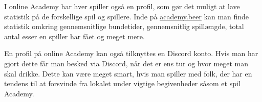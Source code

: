 I online Academy har hver spiller også en profil, som gør det muligt at lave statistik på de forskellige spil og spillere. Inde på \href{https://academy.beer/}{academy.beer} kan man finde statistik omkring gennemsnitlige bundetider, gennemsnitlig spillængde, total antal esser en spiller har fået og meget mere. %
 
En profil på online Academy kan også tilknyttes en Discord konto. Hvis man har gjort dette får man besked via Discord, når det er ens tur og hvor meget man skal drikke. Dette kan være meget smart, hvis man spiller med folk, der har en tendens til at forsvinde fra lokalet under vigtige begivenheder såsom et spil Academy.